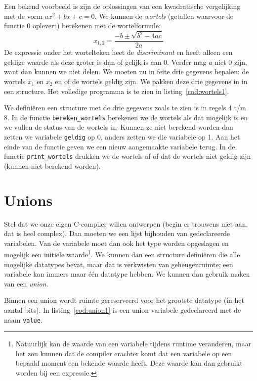Een bekend voorbeeld is zijn de oplossingen van een kwadratische vergelijking met de vorm $ax^2+bx+c=0$. We kunnen de \textsl{wortels} (getallen waarvoor de functie 0 oplevert) berekenen met de wortelformule:
%
\begin{equation}
x_{1,2} = \dfrac{-b\pm\sqrt{b^2-4ac}}{2a}
\end{equation}
%
De expressie onder het wortelteken heet de \textsl{discriminant} en heeft alleen een geldige waarde als deze groter is dan of gelijk is aan 0. Verder mag $a$ niet 0 zijn, want dan kunnen we niet delen. We moeten nu in feite drie gegevens bepalen: de wortels $x_1$ en $x_2$ en of de wortels geldig zijn. We pakken deze drie gegevens in in een structure. Het volledige programma is te zien in listing~\ref{cod:wortels1}.

We definiëren een structure met de drie gegevens zoals te zien is in regels 4 t/m 8. In de functie \texttt{bereken\_wortels} berekenen we de wortels als dat mogelijk is en we vullen de status van de wortels in. Kunnen ze niet berekend worden dan zetten we variabele \texttt{geldig} op 0, anders zetten we die variabele op 1. Aan het einde van de functie geven we een nieuw aangemaakte variabele terug. In de functie \texttt{print\_wortels} drukken we de wortels af of dat de wortels niet geldig zijn (kunnen niet berekend worden).



\advanced
\section{Unions}
Stel dat we onze eigen C-compiler willen ontwerpen (begin er trouwens niet aan, dat is heel complex). Dan moeten we een lijst bijhouden van gedeclareerde variabelen. Van de variabele moet dan ook het type worden opgeslagen en mogelijk een initiële waarde\footnote{Natuurlijk kan de waarde van een variabele tijdens runtime veranderen, maar het zou kunnen dat de compiler erachter komt dat een variabele op een bepaald moment een bekende waarde heeft. Deze waarde kan dan gebruikt worden bij een expressie.}. We kunnen dan een structure definiëren die alle mogelijke datatypes bevat, maar dat is verkwisten van geheugenruimte; een variabele kan immers maar één datatype hebben. We kunnen dan gebruik maken van een \textsl{union}.

Binnen een union wordt ruimte gereserveerd voor het grootste datatype (in het aantal bits). In listing~\ref{cod:union1} is een union variabele gedeclareerd met de naam \texttt{value}.

